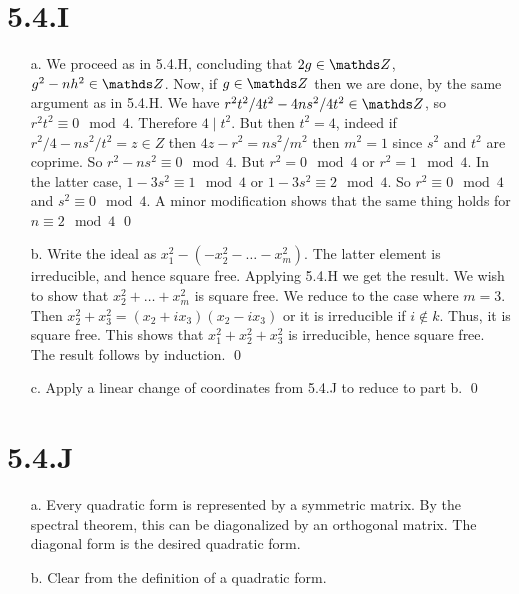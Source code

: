 \documentclass{article}
\begin{document}
\section{5.4.I}
\begin{itemize}
    \item[a.] We proceed as in 5.4.H, concluding that $2g \in \Z$, $g^2-nh^2 \in \Z$. Now, if $g \in \Z$ then we are done, by the same argument as in 5.4.H. We have $r^2t^2/4t^2-4ns^2/4t^2 \in \Z$, so $r^2t^2 \equiv 0 \mod 4$. Therefore $4 \mid t^2$. But then $t^2 = 4$, indeed if $r^2/4-ns^2/t^2=z \in Z$ then $4z-r^2=ns^2/m^2$ then $m^2=1$ since $s^2$ and $t^2$ are coprime. So $r^2-ns^2 \equiv 0 \mod 4$. But $r^2 = 0 \mod 4$ or $r^2 = 1 \mod 4$. In the latter case, $1-3s^2 \equiv 1 \mod 4$ or $1-3s^2 \equiv 2 \mod 4$. So $r^2 \equiv 0 \mod 4$ and $s^2 \equiv 0 \mod 4$. A minor modification shows that the same thing holds for $n \equiv 2 \mod 4$ \qed
    \item[b.] Write the ideal as $x_1^2-(-x_2^2-\dots-x_m^2)$. The latter element is irreducible, and hence square free. Applying 5.4.H we get the result.
          We wish to show that $x_2^2+\dots+x_m^2$ is square free. We reduce to the case where $m=3$. Then $x_2^2+x_3^2=(x_2+ix_3)(x_2-ix_3)$ or it is irreducible if $i \notin k$. Thus, it is square free. This shows that $x_1^2+x_2^2+x_3^2$ is irreducible, hence square free. The result follows by induction. \qed
    \item[c.] Apply a linear change of coordinates from 5.4.J to reduce to part b. \qed
\end{itemize}

\section{5.4.J}
\begin{itemize}
    \item[a.] Every quadratic form is represented by a symmetric matrix. By the spectral theorem, this can be diagonalized by an orthogonal matrix. The diagonal form is the desired quadratic form.
    \item[b.] Clear from the definition of a quadratic form.
\end{itemize}
\end{document}
